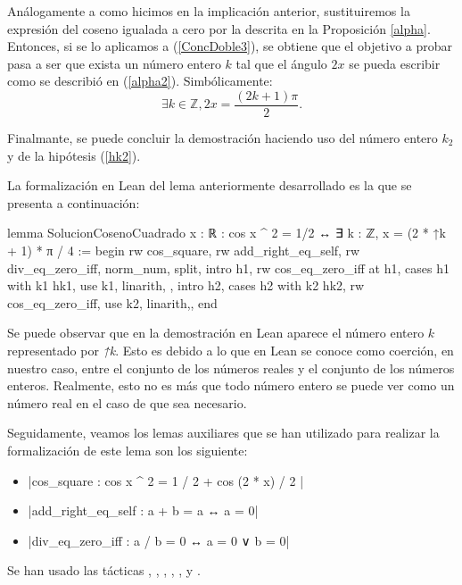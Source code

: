 \begin{demostracion}
    Análogamente a como hicimos en la implicación anterior,
    sustituiremos la expresión del coseno igualada a cero por la
    descrita en la Proposición \ref{alpha}. Entonces, si se lo aplicamos
    a (\ref{ConcDoble3}), se obtiene que el objetivo a probar pasa a ser
    que exista un número entero \(k\) tal que el ángulo \(2x\) se pueda
    escribir como se describió en (\ref{alpha2}). Simbólicamente:
    \begin{equation}
      ∃ k∈ ℤ, 2x = \frac{(2k+1)π}{2}.
    \end{equation}

    Finalmante, se puede concluir la demostración haciendo uso del
    número entero \(k_2\) y de la hipótesis (\ref{hk2}).
\end{demostracion}

La formalización en Lean del lema anteriormente desarrollado es
la que se presenta a continuación:
\begin{leancode}
lemma SolucionCosenoCuadrado
  {x : ℝ}
  : cos x ^ 2 = 1/2 ↔ ∃ k : ℤ, x = (2 * ↑k + 1) * π / 4 :=
begin
  rw cos_square,
  rw add_right_eq_self,
  rw div_eq_zero_iff,
  norm_num,
  split,
  { intro h1,
    rw cos_eq_zero_iff at h1,
    cases h1 with k1 hk1,
    use k1,
    linarith, },
  { intro h2,
    cases h2 with k2 hk2,
    rw cos_eq_zero_iff,
    use k2,
    linarith,},
end
\end{leancode}

Se puede observar que en la demostración en Lean aparece el número entero
\(k\) representado por \textit{↑k}. Esto es debido a lo que en Lean se
conoce como coerción, en nuestro caso, entre el conjunto de los
números reales y el conjunto de los números enteros. Realmente, esto no es
más que todo número entero se puede ver como un número real en el
caso de que sea necesario. 

Seguidamente, veamos los lemas auxiliares que se han utilizado
para realizar la formalización de este lema son los siguiente:
\begin{itemize}
\item {}|cos_square : cos x ^ 2 = 1 / 2 + cos (2 * x) / 2 |
\item {}|add_right_eq_self : a + b = a ↔ a = 0|
\item {}|div_eq_zero_iff : a / b = 0 ↔ a = 0 ∨ b = 0|
\end{itemize}
Se han usado las tácticas
,
,
,
,
,
 y
.

